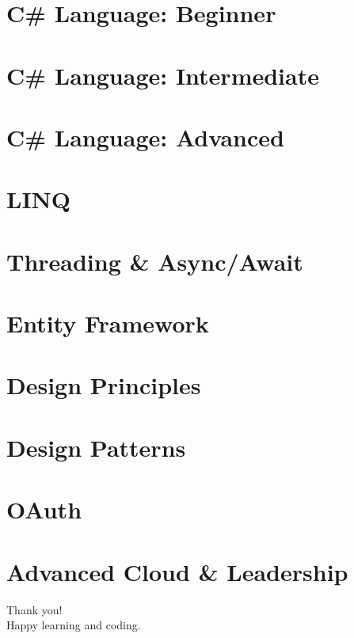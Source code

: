 \documentclass{mybeamer}
\begin{document}
\hypertarget{sec1}{}
\section{C\# Language: Beginner}


\hypertarget{sec2}{}
\section{C\# Language: Intermediate}


\hypertarget{sec3}{}
\section{C\# Language: Advanced}


\hypertarget{sec4}{}
\section{LINQ}


\hypertarget{sec5}{}
\section{Threading \& Async/Await}


\hypertarget{sec6}{}
\section{Entity Framework}


\hypertarget{sec7}{}
\section{Design Principles}


\hypertarget{sec8}{}
\section{Design Patterns}


\hypertarget{sec9}{}
\section{OAuth}


\hypertarget{sec10}{}
\section{Advanced Cloud \& Leadership}


\begin{frame}
  \centering
  {\Huge Thank you!}\\[0.5em]
  Happy learning and coding.
\end{frame}
\end{document}
